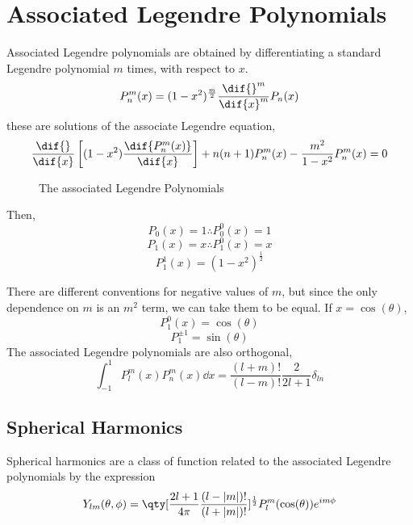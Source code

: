 \section{Associated Legendre Polynomials}
\label{sec:assocpolynomials}

Associated Legendre polynomials are obtained by differentiating a
standard Legendre polynomial $m$ times, with respect to $x$.
\begin{equation}
  \label{eq:definitionassocleg}
  P_n^m(x) = (1-x^2)^{\frac{m}{2}} \frac{\dif{}^m}{\dif{x}^m} P_n(x)
\end{equation}
these are solutions of the associate Legendre equation,
\begin{equation}
  \label{eq:assoclegendrede}
  \frac{\dif{}}{\dif{x}} \left[ (1-x^2) \frac{\dif{P_n^m(x)}}{\dif{x}} \right] + n(n+1)P_n^m(x) - \frac{m^2}{1-x^2} P_n^m(x) = 0
\end{equation}

\begin{figure}
  \centering
  
  \caption{The associated Legendre Polynomials}
  \label{fig:assoclegendre}
\end{figure}

Then,
\[ P_0(x) = 1 \therefore P_0^0(x) = 1 \]
\[ P_1(x) = x \therefore P_1^0(x) = x \]
\[ P_1^1(x) = (1-x^2)^{\frac{1}{2}} \]

There are different conventions for negative values of $m$, but since
the only dependence on $m$ is an $m^2$ term, we can take them to be
equal.  If $x = \cos (\theta)$,
\[ P_1^0(x) = \cos(\theta) \]
\[ P_1^{\pm 1} = \sin(\theta) \]
The associated Legendre polynomials are also orthogonal,
\begin{equation}
  \label{eq:orthogonalityassoclag}
  \int_{-1}^1 P_l^m(x) P_n^m(x) \dd{x} = \frac{(l+m)!}{(l-m)!} \frac{2}{2l+1} \delta_{ln}
\end{equation}


\subsection{Spherical Harmonics}
\label{sec:spharmonics}
Spherical harmonics are a class of function related to the associated Legendre polynomials by the expression
\begin{equation}
  \label{eq:spharmonicdef}
  Y_{lm}(\theta, \phi) = \qty[ \frac{2l+1}{4 \pi} \frac{(l-|m|)!}{(l+|m|)!}]^{\frac{1}{2}} P_l^m (\cos(\theta)) e^{im\phi}
\end{equation}

